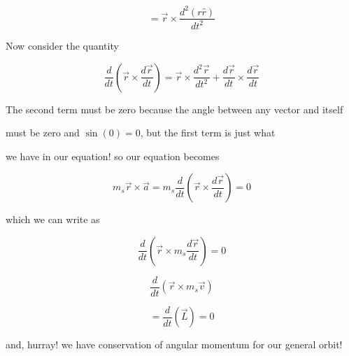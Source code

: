$$=\overrightarrow{r}\times \frac{d^{2}\left( r\hat{r}\right) }{dt^{2}}$$


Now consider the quantity 

$$\frac{d}{dt}\left( \overrightarrow{r}\times \frac{d\overrightarrow{r}}{dt}\right)=\overrightarrow{r}\times\frac{d^{2}\overrightarrow{r}}{dt^{2}}+\frac{d\overrightarrow{r}}{dt}\times \frac{d\overrightarrow{r}}{dt}$$

The second term must be zero because the angle between any vector and itself

must be zero and $\sin \left( 0\right) =0$, but the first term is just what

we have in our equation! so our equation becomes%

$$m_{s}\overrightarrow{r}\times \overrightarrow{a}=m_{s}\frac{d}{dt}\left( \overrightarrow{r}\times \frac{d\overrightarrow{r}}{dt}\right) =0$$

which we can write as%

$$\frac{d}{dt}\left( \overrightarrow{r}\times m_{s}\frac{d\overrightarrow{r}}{dt}\right) =0$$

$$\frac{d}{dt}\left( \overrightarrow{r}\times m_{s}\overrightarrow{v}\right) $$



$$=\frac{d}{dt}\left( \overrightarrow{L}\right) =0$$

and, hurray! we have conservation of angular momentum for our general orbit!


